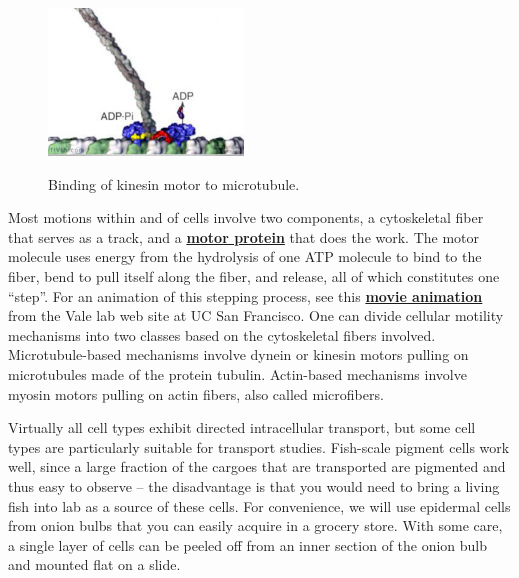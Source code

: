\documentclass{../lab}
\begin{document}
\begin{figure}[h]
\begin{minipage}{0.32\linewidth}
    \label{fig:250px-BMC_Cytoskeleton}
\end{minipage}\hfill
\begin{minipage}{0.32\linewidth}
    \centering
    \href{http://experimentationlab.berkeley.edu/sites/default/files/images/196px-Kinesin.jpg}{\includegraphics[width=\linewidth,keepaspectratio]{images/196px-Kinesin.jpg}} \\
    \caption{Binding of kinesin motor to microtubule.}
\end{minipage} 
\end{figure}

Most motions within and of cells involve two components, a cytoskeletal fiber that serves as a track, and a \href{http://physics111.lib.berkeley.edu/Physics111/Reprints/OTZ/biowikipedia.pdf}{\textbf{motor protein}} that does the work. The motor molecule uses energy from the hydrolysis of one ATP molecule to bind to the fiber, bend to pull itself along the fiber, and release, all of which constitutes one ``step''. For an animation of this stepping process, see this \href{http://experimentationlab.berkeley.edu/sites/default/files/Kinesin_Motion.mp4}{\textbf{movie animation}} from the Vale lab web site at UC San Francisco. One can divide cellular motility mechanisms into two classes based on the cytoskeletal fibers involved. Microtubule-based mechanisms involve dynein or kinesin motors pulling on microtubules made of the protein tubulin. Actin-based mechanisms involve myosin motors pulling on actin fibers, also called microfibers.

Virtually all cell types exhibit directed intracellular transport, but some cell types are particularly suitable for transport studies. Fish-scale pigment cells work well, since a large fraction of the cargoes that are transported are pigmented and thus easy to observe – the disadvantage is that you would need to bring a living fish into lab as a source of these cells. For convenience, we will use epidermal cells from onion bulbs that you can easily acquire in a grocery store. With some care, a single layer of cells can be peeled off from an inner section of the onion bulb and mounted flat on a slide.
\end{document}
